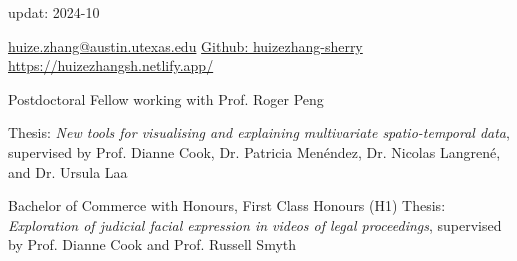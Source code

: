 \documentclass[10pt,a4paper]{article} %
\begin{document}
 


\begin{CJK}{UTF8}{gbsn}
\end{CJK}
\hfill
updat: 2024-10
\spacedhrule{0.2em}{-0.4em} %

\vspace{0.25cm}
\noindent
\href{mailto:huize.zhang@austin.utexas.edu}{huize.zhang@austin.utexas.edu}
\hspace{4em}
\href{https://github.com/huizezhang-sherry/}{Github: huizezhang-sherry}
\hfill
\href{https://huizezhangsh.netlify.app/}{https://huizezhangsh.netlify.app/}




    {Postdoctoral Fellow working with Prof. Roger Peng
    }

    {Thesis: \textit{New tools for visualising and explaining multivariate spatio-temporal data},
    supervised by Prof. Dianne Cook, Dr. Patricia Men\'endez, Dr. Nicolas Langren\'e, and Dr. Ursula Laa 
    }

    {Bachelor of Commerce with Honours, First Class Honours (H1) \newline
    Thesis: \textit{Exploration of judicial facial expression in videos of legal proceedings}, supervised by Prof. Dianne Cook and Prof. Russell Smyth
    }
\end{document}

